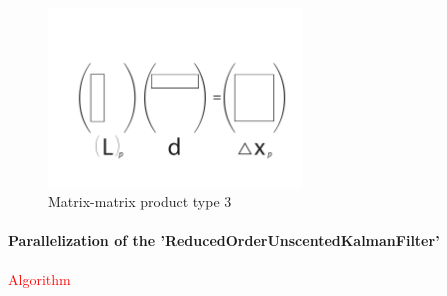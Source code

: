 \begin{itemize}
     \begin{figure}[htpb]
        \includegraphics[width=0.6\textwidth]{figure/p94.pdf}
        \caption{Matrix-matrix product type 3}
        \label{matrix_3}
\end{figure}



  \end{itemize}


\hypertarget{par-seq-algo-roukf}{}\paragraph{Parallelization of the 'ReducedOrderUnscentedKalmanFilter'}\label{par-seq-algo-roukf}

  \par \textcolor{red}{Algorithm}\\


